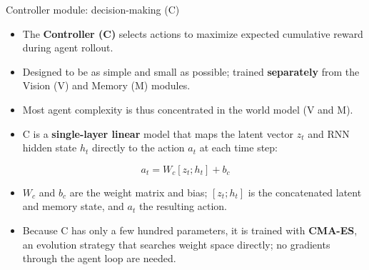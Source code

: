\begin{frame}{Controller module: decision-making (C)}
    \begin{itemize}\itemsep0.18em
      \item[\textcolor{red}{$\blacktriangleright$}] The \textbf{Controller (C)} selects actions to maximize expected cumulative reward during agent rollout.
      \item[\textcolor{red}{$\blacktriangleright$}] Designed to be as simple and small as possible; trained \textbf{separately} from the Vision (V) and Memory (M) modules.
      \item[\textcolor{red}{$\blacktriangleright$}] Most agent complexity is thus concentrated in the world model (V and M).
      \item[\textcolor{red}{$\blacktriangleright$}] C is a \textbf{single-layer linear} model that maps the latent vector $z_t$ and RNN hidden state $h_t$ directly to the action $a_t$ at each time step:
    \end{itemize}
    {\small
    \[
      a_t = W_c [z_t; h_t] + b_c
    \]
    }
    \begin{itemize}\itemsep0.15em
      \item[\textcolor{red}{$\blacktriangleright$}] $W_c$ and $b_c$ are the weight matrix and bias; $[z_t; h_t]$ is the concatenated latent and memory state, and $a_t$ the resulting action.
      \item[\textcolor{red}{$\blacktriangleright$}] Because C has only a few hundred parameters, it is trained with \textbf{CMA-ES}, an evolution strategy that searches weight space directly; no gradients through the agent loop are needed.
    \end{itemize}
\end{frame}

